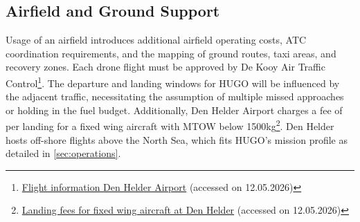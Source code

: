 \subsection{Airfield and Ground Support}
\label{subsec:ground_support}
Usage of an airfield introduces additional airfield operating costs, ATC coordination requirements, and the mapping of ground routes, taxi areas, and recovery zones. Each drone flight must be approved by De Kooy Air Traffic Control\footnote{\href{https://denhelderairport.nl/eng/flight-information/}{Flight information Den Helder Airport} (accessed on 12.05.2026)}. The departure and landing windows for HUGO will be influenced by the adjacent traffic, necessitating the assumption of multiple missed approaches or holding in the fuel budget. Additionally, Den Helder Airport charges a fee of  per landing for a fixed wing aircraft with MTOW below 1500kg\footnote{\href{https://denhelderairport.nl/wp-content/uploads/2026/01/2026-fixed-wing-miv-01-01-2026-2.pdf}{Landing fees for fixed wing aircraft at Den Helder} (accessed on 12.05.2026)}.
Den Helder hosts off-shore flights above the North Sea, which fits HUGO's mission profile as detailed in \autoref{sec:operations}. %




